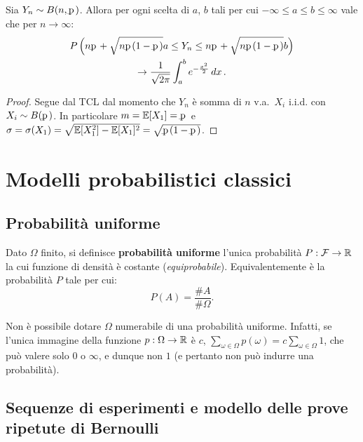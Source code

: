 \begin{multicols*}{2}
\begin{corollary}
    Sia $Y_n \sim B(n, \pp)$. Allora per ogni scelta di $a$, $b$ tali per cui
    $-\infty \leq a \leq b \leq \infty$ vale che per $n \to \infty$:
    \begin{multline*}
        P\left(n\pp + \sqrt{n \pp (1- \pp)} a  \leq Y_n \leq n\pp + \sqrt{n \pp (1 - \pp)} b\right) \\
        \to \frac{1}{\sqrt{2\pi}}\int_a^b e^{-\frac{x^2}{2}} \dx.
    \end{multline*}
\end{corollary}

\begin{proof}
    Segue dal TCL dal momento che $Y_n$ è somma di $n$ v.a.~$X_i$ i.i.d. con $X_i \sim B(\pp)$. In particolare $m = \EE[X_1] = \pp$ e $\sigma = \sigma(X_1) = \sqrt{\EE[X_1^2] - \EE[X_1]^2} = \sqrt{\pp (1-\pp)}$.
\end{proof}

\section{Modelli probabilistici classici}

\subsection{Probabilità uniforme}

\begin{definition}
    Dato $\Omega$ finito, si definisce
    \textbf{probabilità uniforme} l'unica probabilità
    $P : \mathcal{F} \to \mathbb{R}$ la cui funzione di densità
    è costante (\textit{equiprobabile}). Equivalentemente è la probabilità
    $P$ tale per cui:
    \[
        P(A) = \frac{\#A}{\#\Omega}.
    \]
\end{definition}

\begin{remark}
    Non è possibile dotare $\Omega$ numerabile di una probabilità
    uniforme. Infatti, se l'unica immagine della funzione $p : \Omega \to \mathbb{R}$ è
    $c$, $\sum_{\omega \in \Omega} p(\omega) = c \sum_{\omega \in \Omega} 1$, che
    può valere solo $0$ o $\infty$, e dunque non $1$ (e pertanto non può indurre
    una probabilità).
\end{remark}

\subsection{Sequenze di esperimenti e modello delle prove ripetute di Bernoulli}


\end{multicols*}
